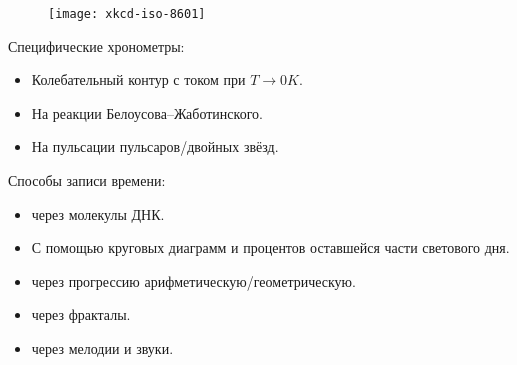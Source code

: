 \begin{flushleft}
    \begin{figure}[ht!]
        \centering
        \texttt{[image: xkcd-iso-8601]}
    \end{figure}

    Специфические хронометры:
    \begin{itemize}
        \item Колебательный контур с током при \( T \to 0 K \).
        \item На реакции Белоусова--Жаботинского.
        \item На пульсации пульсаров/двойных звёзд.
    \end{itemize}

    Способы записи времени:
    \begin{itemize}
        \item через молекулы ДНК.
        \item С помощью круговых диаграмм и процентов оставшейся части светового дня.
        \item через прогрессию арифметическую/геометрическую.
        \item через фракталы.
        \item через мелодии и звуки.
    \end{itemize}


\end{flushleft}
